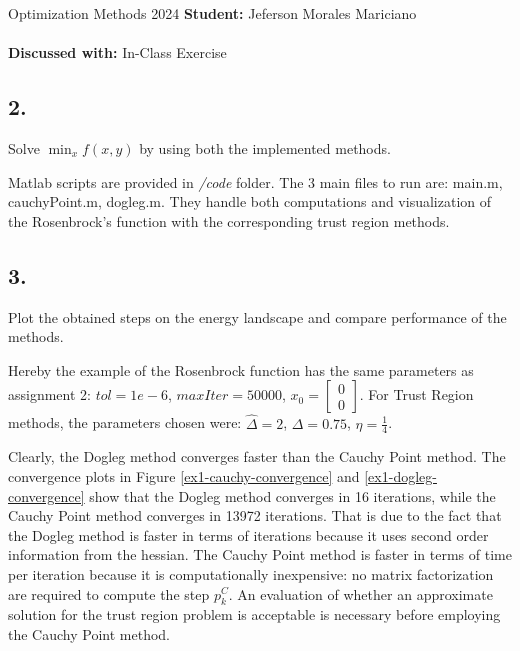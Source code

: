 \documentclass[unicode,11pt,a4paper,oneside,numbers=endperiod,openany]{scrartcl}
\newcommand{\myvec}[1]{\begin{bmatrix} #1 \end{bmatrix}}
\begin{document}
\setassignment
{}

\serieheader
{Optimization Methods}
{2024}
{\textbf{Student:} Jeferson Morales Mariciano \\\\}
{\textbf{Discussed with:}}
{In-Class Exercise}{}
\newline



\subsection*{2.}
Solve $\min_{x} f(x, y)$ by using both the implemented methods. \\\newline

Matlab scripts are provided in \textit{/code} folder. 
The 3 main files to run are: main.m, cauchyPoint.m, dogleg.m. 
They handle both computations and visualization of the Rosenbrock's function 
with the corresponding trust region methods.

\subsection*{3.}
Plot the obtained steps on the energy landscape and compare performance of the methods. \\\newline

Hereby the example of the Rosenbrock function has the same parameters as assignment 2:
$tol = 1e-6$, $maxIter = 50000$, $x_0 = \myvec{0 \\ 0}$.
For Trust Region methods, the parameters chosen were:
$\hat{\Delta} = 2$, $\Delta = 0.75$, $\eta = \frac{1}{4}$.

Clearly, the Dogleg method converges faster than the Cauchy Point method.
The convergence plots in Figure \ref{ex1-cauchy-convergence} and \ref{ex1-dogleg-convergence}
show that the Dogleg method converges in 16 iterations, 
while the Cauchy Point method converges in 13972 iterations.
That is due to the fact that the Dogleg method is faster in terms of iterations
because it uses second order information from the hessian.
The Cauchy Point method is faster in terms of time per iteration 
because it is computationally inexpensive:
no matrix factorization are required to compute the step $p_k^C$.
An evaluation of whether an approximate solution for the trust region problem is acceptable
is necessary before employing the Cauchy Point method.
\end{document}
